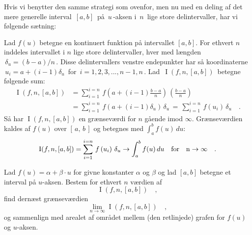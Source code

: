 Hvis vi benytter den samme strategi som ovenfor, men nu med en deling
af det mere generelle interval $\,[a, b]\,$ på
$\,u\,$-aksen i $\,n\,$ lige store
delintervaller, har vi følgende sætning:

\begin{theorem}\label{thmInt}
Lad $f(u)$ betegne en kontinuert funktion på intervallet $[a,b]$.
For ethvert $n$ inddeles intervallet i $n$ lige store
delintervaller, hver med længden $\,\delta_{u} = (b-a)/n\,$. Disse
delintervallers venstre endepunkter har så koordinaterne $\,u_{i} =
a + (i-1)\delta_{u}\,$ for $\, i = 1, 2, 3, ..., n-1, n \,$. Lad
$\,\operatorname{I}(f, n, [a,b])\,$ betegne følgende sum:
\begin{equation} \label{eqIS1}
\begin{aligned}
 \operatorname{I}(f, n, [a,b]) &= \sum_{i=1}^{i=n}\, f\left(a+
(i-1)\frac{b-a}{n}\right)\,\left(\frac{b-a}{n}\right) \\
&= \sum_{i=1}^{i=n}\, f\left(a+
(i-1)\delta_{u}\right)\,\delta_{u} \,
= \,
\sum_{i=1}^{i=n}\, f\left(u_{i}\right)\,\delta_{u} \quad .
\end{aligned}
\end{equation}
Så har  $\operatorname{I}(f,n, [a, b])$ en grænseværdi for $n$ gående imod $\infty$. Grænseværdien kaldes  af $f(u)$ over $[\,a,\, b\,]$ og betegnes med $\int_{a}^{b} f(u)\, du$:
\begin{equation}
\operatorname{I}(f,n, [a, b]) =  \sum_{i=1}^{i=n}\, f\left(u_{i}\right)\,\delta_{u} \to \int_{a}^{b} f(u)\, du \quad \rm{for}\quad  n \to \infty\quad.
\end{equation}
\end{theorem}


\begin{exercise}
Lad $f(u) = \alpha + \beta\cdot u$ for givne konstanter $\alpha$ og $\beta$ og lad $[a, b]$ betegne et interval på $u$-aksen. Bestem for ethvert $n$ værdien af
\begin{equation}
 \operatorname{I}(f,n, [a,b]) \quad ,
\end{equation}
find dernæst grænseværdien
\begin{equation}
\lim_{n \to \infty} \operatorname{I}(f,n, [a,b]) \quad ,
\end{equation}
og sammenlign med arealet af området mellem (den retlinjede) grafen for $f(u)$ og $u$-aksen.
\end{exercise}



